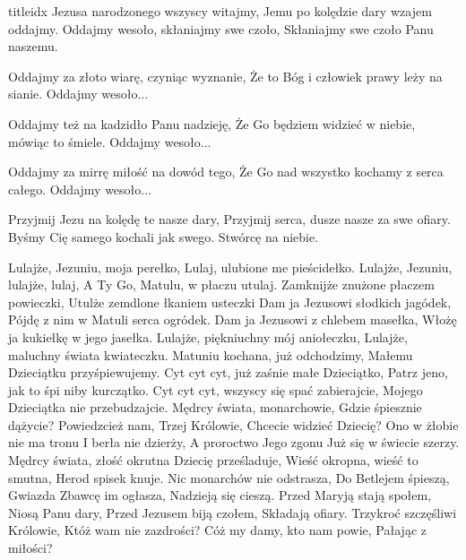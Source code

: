 \documentclass[a5paper, portrait, 12pt]{mwart}
\begin{document}
\begin{songs}{titleidx}
\beginverse
Jezusa narodzonego wszyscy witajmy,
Jemu po kolędzie dary wzajem oddajmy.
\endverse
\beginchorus
Oddajmy wesoło, skłaniajmy swe czoło,
Skłaniajmy swe czoło Panu naszemu.
\endchorus

\beginverse
Oddajmy za złoto wiarę, czyniąc wyznanie,
Że to Bóg i człowiek prawy leży na sianie.
\endverse
\beginchorus
Oddajmy wesoło...
\endchorus

\beginverse
Oddajmy też na kadzidło Panu nadzieję,
Że Go będziem widzieć w niebie, mówiąc to śmiele.
\endverse
\beginchorus
Oddajmy wesoło...
\endchorus

\beginverse
Oddajmy za mirrę miłość na dowód tego,
Że Go nad wszystko kochamy z serca całego.
\endverse
\beginchorus
Oddajmy wesoło...
\endchorus

\beginverse
Przyjmij Jezu na kolędę te nasze dary,
Przyjmij serca, dusze nasze za swe ofiary.
Byśmy Cię samego kochali jak swego.
Stwórcę na niebie.
\endverse
\endsong


\beginverse
    Lulajże, Jezuniu, moja perełko,
    Lulaj, ulubione me pieścidełko.
\endverse
\beginchorus
        Lulajże, Jezuniu, lulajże, lulaj,
        A Ty Go, Matulu, w płaczu utulaj.
\endchorus
\beginverse
    Zamknijże znużone płaczem powieczki,
    Utulże zemdlone łkaniem usteczki
\endverse
\beginverse
    Dam ja Jezusowi słodkich jagódek,
    Pójdę z nim w Matuli serca ogródek.
\endverse
\beginverse
    Dam ja Jezusowi z chlebem masełka,
    Włożę ja kukiełkę w jego jasełka.
\endverse
\beginverse
    Lulajże, piękniuchny mój aniołeczku,
    Lulajże, maluchny świata kwiateczku.
\endverse
\beginverse
    Matuniu kochana, już odchodzimy,
    Małemu Dzieciątku przyśpiewujemy.
\endverse
\beginverse
    Cyt cyt cyt, już zaśnie małe Dzieciątko,
    Patrz jeno, jak to śpi niby kurczątko.
\endverse
\beginverse
    Cyt cyt cyt, wszyscy się spać zabierajcie,
    Mojego Dzieciątka nie przebudzajcie.
\endverse
\endsong
\beginverse
    Mędrcy świata, monarchowie,
    Gdzie śpiesznie dążycie?
    Powiedzcież nam, Trzej Królowie,
    Chcecie widzieć Dziecię?
\endverse
\beginchorus
    Ono w żłobie nie ma tronu
    I berła nie dzierży,
    A proroctwo Jego zgonu
    Już się w świecie szerzy.
\endchorus
\beginverse
    Mędrcy świata, złość okrutna
    Dziecię prześladuje,
    Wieść okropna, wieść to smutna,
    Herod spisek knuje.
\endverse
\beginchorus
    Nic monarchów nie odstrasza,
    Do Betlejem śpieszą,
    Gwiazda Zbawcę im ogłasza,
    Nadzieją się cieszą.
\endchorus
\beginverse
    Przed Maryją stają społem,
    Niosą Panu dary,
    Przed Jezusem biją czołem,
    Składają ofiary.
\endverse
\beginchorus
    Trzykroć szczęśliwi Królowie,
    Któż wam nie zazdrości?
    Cóż my damy, kto nam powie,
    Pałając z miłości?
\endchorus
\endsong



\end{songs}
\end{document}
